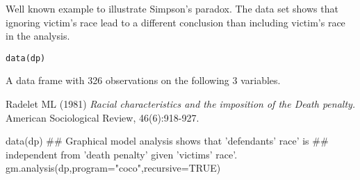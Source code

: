 \begin{Description}\relax
Well known example to illustrate Simpson's paradox.
The data set shows that ignoring victim's race lead to a different conclusion
than including victim's race in the analysis.
\end{Description}
\begin{Usage}
\begin{verbatim}data(dp)\end{verbatim}
\end{Usage}
\begin{Format}\relax
A data frame with 326 observations on the following 3 variables.
\end{Format}
\begin{Source}\relax
Radelet ML (1981) \emph{Racial characteristics and the imposition of the Death penalty.}
American Sociological Review, 46(6):918-927.
\end{Source}
\begin{Examples}
\begin{ExampleCode}
data(dp)
## Graphical model analysis shows that 'defendants' race' is 
## independent from 'death penalty' given 'victims' race'.
gm.analysis(dp,program="coco",recursive=TRUE)
\end{ExampleCode}
\end{Examples}

